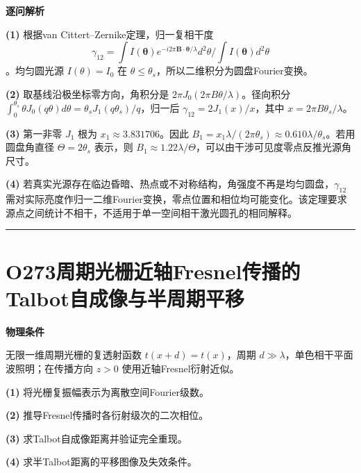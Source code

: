 \documentclass[UTF8,a4paper,11pt,oneside,openany]{ctexbook}
\begin{document}
\par\medskip\noindent\textbf{逐问解析}
\par\noindent\textbf{(1)} 根据van Cittert–Zernike定理，归一复相干度 \[\gamma_{12}=\int I(\boldsymbol\theta)e^{-i2\pi\boldsymbol B\cdot\boldsymbol\theta/\lambda}d^2\theta/\int I(\boldsymbol\theta)d^2\theta\]。均匀圆光源 \(I(\theta)=I_0\) 在 \(\theta\le\theta_s\)，所以二维积分为圆盘Fourier变换。
\par\noindent\textbf{(2)} 取基线沿极坐标零方向，角积分是 \(2\pi J_0(2\pi B\theta/\lambda)\)。径向积分 \(\int_0^{\theta_s}\theta J_0(q\theta)d\theta=\theta_sJ_1(q\theta_s)/q\)，归一后 \(\gamma_{12}=2J_1(x)/x\)，其中 \(x=2\pi B\theta_s/\lambda\)。
\par\noindent\textbf{(3)} 第一非零 \(J_1\) 根为 \(x_1\approx3.831706\)。因此 \(B_1=x_1\lambda/(2\pi\theta_s)\approx0.610\lambda/\theta_s\)。若用圆盘角直径 \(\Theta=2\theta_s\) 表示，则 \(B_1\approx1.22\lambda/\Theta\)，可以由干涉可见度零点反推光源角尺寸。
\par\noindent\textbf{(4)} 若真实光源存在临边昏暗、热点或不对称结构，角强度不再是均匀圆盘，\(\gamma_{12}\) 需对实际亮度作归一二维Fourier变换，零点位置和相位均可能变化。该定理要求源点之间统计不相干，不适用于单一空间相干激光圆孔的相同解释。

\par\bigskip\hrule\bigskip
\section*{O273\quad 周期光栅近轴Fresnel传播的Talbot自成像与半周期平移}
\textbf{物理条件}\par 无限一维周期光栅的复透射函数 \(t(x+d)=t(x)\)，周期 \(d\gg\lambda\)，单色相干平面波照明；在传播方向 \(z>0\) 使用近轴Fresnel衍射近似。
\par\noindent\textbf{(1)} 将光栅复振幅表示为离散空间Fourier级数。
\par\noindent\textbf{(2)} 推导Fresnel传播时各衍射级次的二次相位。
\par\noindent\textbf{(3)} 求Talbot自成像距离并验证完全重现。
\par\noindent\textbf{(4)} 求半Talbot距离的平移图像及失效条件。
\end{document}
